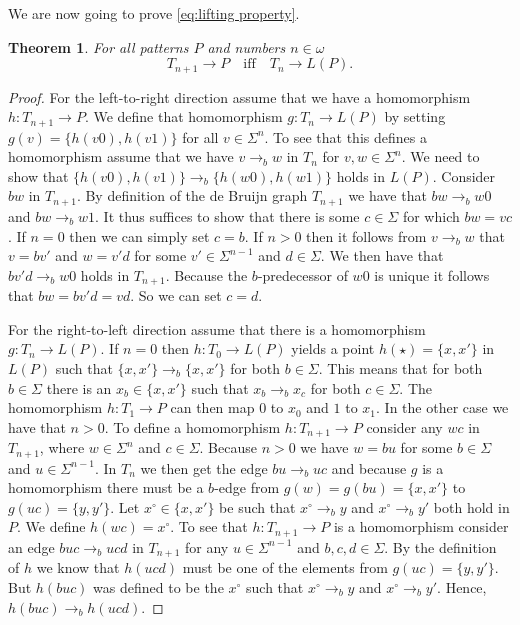 \documentclass[a4paper]{article}
\renewcommand{\iff}{\quad \mbox{iff} \quad}
\newtheorem{theorem}{Theorem}
\begin{document}
We are now going to prove \eqref{eq:lifting property}.
\begin{theorem}
 For all patterns $P$ and numbers $n \in \omega$  
\begin{equation*}
 T_{n + 1} \to P \iff T_n \to L(P).
\end{equation*}
\end{theorem}
\begin{proof}
 For the left-to-right direction assume that we have a homomorphism $h :
T_{n + 1} \to P$. We define that homomorphism $g : T_n \to L(P)$ by
setting $g(v) = \{h(v0),h(v1)\}$ for all $v \in \Sigma^n$. To see that
this defines a homomorphism assume that we have $v \rightarrow_b w$ in
$T_n$ for $v,w \in \Sigma^n$. We need to show that $\{h(v0),h(v1)\}
\rightarrow_b \{h(w0),h(w1)\}$ holds in $L(P)$. Consider $bw$ in $T_{n +
1}$. By definition of the de Bruijn graph $T_{n + 1}$ we have that $bw
\rightarrow_b w0$ and $bw \rightarrow_b w1$. It thus suffices to show
that there is some $c \in \Sigma$ for which $bw = vc$. If $n = 0$ then
we can simply set $c = b$. If $n > 0$ then it follows from $v
\rightarrow_b w$ that $v = b v'$ and $w = v' d$ for some $v' \in
\Sigma^{n - 1}$ and $d \in \Sigma$. We then have that $b v' d
\rightarrow_b w 0$ holds in $T_{n + 1}$. Because the $b$-predecessor of
$w 0$ is unique it follows that $b w = b v' d = v d$. So we can set $c =
d$.

 For the right-to-left direction assume that there is a homomorphism $g
: T_n \to L(P)$. If $n = 0$ then $h : T_0 \rightarrow L(P)$ yields a
point $h(\star) = \{x,x'\}$ in $L(P)$ such that $\{x,x'\} \rightarrow_b
\{x,x'\}$ for both $b \in \Sigma$. This means that for both $b \in
\Sigma$ there is an $x_b \in \{x,x'\}$ such that $x_b \rightarrow_b x_c$
for both $c \in \Sigma$. The homomorphism $h : T_1 \to P$ can then map
$0$ to $x_0$ and $1$ to $x_1$. In the other case we have that $n > 0$.
To define a homomorphism $h : T_{n + 1} \to P$ consider any $w c$ in
$T_{n + 1}$, where $w \in \Sigma^n$ and $c \in \Sigma$. Because $n > 0$
we have $w = b u$ for some $b \in \Sigma$ and $u \in \Sigma^{n - 1}$. In
$T_n$ we then get the edge $b u \rightarrow_b u c$ and because $g$ is a
homomorphism there must be a $b$-edge from $g(w) = g(bu) = \{x,x'\}$ to
$g(uc) = \{y,y'\}$. Let $x^\circ \in \{x,x'\}$ be such that $x^\circ
\rightarrow_b y$ and $x^\circ \rightarrow_b y'$ both hold in $P$. We
define $h(wc) = x^\circ$. To see that $h : T_{n + 1} \to P$ is a
homomorphism consider an edge $b u c \rightarrow_b u c d$ in $T_{n + 1}$
for any $u \in \Sigma^{n - 1}$ and $b,c,d \in \Sigma$. By the definition
of $h$ we know that $h(u c d)$ must be one of the elements from $g(u c)
= \{y,y'\}$. But $h(b u c)$ was defined to be the $x^\circ$ such that
$x^\circ \rightarrow_b y$ and $x^\circ \rightarrow_b y'$. Hence, $h(b u
c) \rightarrow_b h(u c d)$.
\end{proof}
\end{document}
